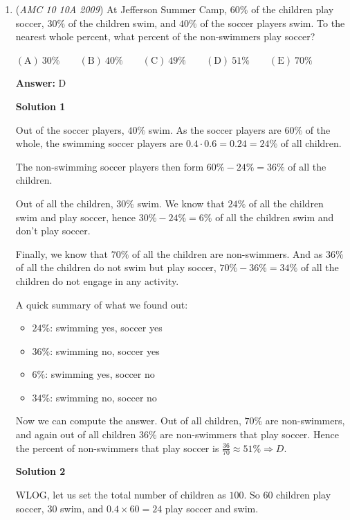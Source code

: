 \begin{enumerate}
 


	\item (\textit{AMC 10 10A 2009}) At Jefferson Summer Camp, $60\%$ of the children play soccer, $30\%$ of the children swim, and $40\%$ of the soccer players swim. To the nearest whole percent, what percent of the non-swimmers play soccer? 


 $\mathrm{(A)}\ 30\% \qquad \mathrm{(B)}\ 40\% \qquad \mathrm{(C)}\ 49\% \qquad \mathrm{(D)}\ 51\% \qquad \mathrm{(E)}\ 70\%$

 \textbf{Answer: }D



\textbf{Solution 1}

Out of the soccer players, $40\%$ swim. As the soccer players are $60\%$ of the whole, the swimming soccer players are $0.4 \cdot 0.6 = 0.24 = 24\%$ of all children.

 The non-swimming soccer players then form $60\% - 24\% = 36\%$ of all the children.

 Out of all the children, $30\%$ swim. We know that $24\%$ of all the children swim and play soccer, hence $30\%-24\% = 6\%$ of all the children swim and don't play soccer.

 Finally, we know that $70\%$ of all the children are non-swimmers. And as $36\%$ of all the children do not swim but play soccer, $70\% - 36\% = 34\%$ of all the children do not engage in any activity.

 A quick summary of what we found out:

 
            \begin{itemize}
        \item $24\%$: swimming yes, soccer yes
        \item $36\%$: swimming no, soccer yes
        \item $6\%$: swimming yes, soccer no
        \item $34\%$: swimming no, soccer no
            \end{itemize}
            Now we can compute the answer. Out of all children, $70\%$ are non-swimmers, and again out of all children $36\%$ are non-swimmers that play soccer. Hence the percent of non-swimmers that play soccer is $\frac{36}{70} \approx 51\% \Rightarrow \boxed{D}$.

 



\textbf{Solution 2}

WLOG, let us set the total number of children as $100$. So $60$ children play soccer, $30$ swim, and $0.4\times60=24$ play soccer and swim. 


\end{enumerate}
